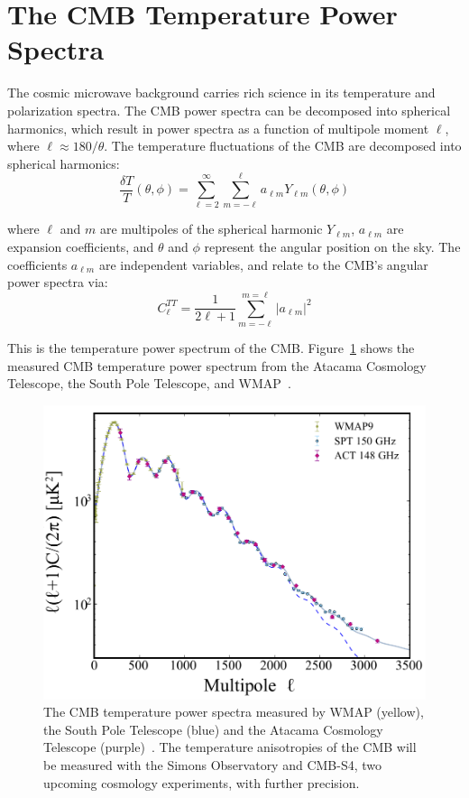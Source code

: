 \section{The CMB Temperature Power Spectra}
The cosmic microwave background carries rich science in its temperature and polarization spectra.  The CMB power spectra can be decomposed into spherical harmonics, which result in power spectra as a function of multipole moment $\ell$, where $\ell\approx180/\theta$.  The temperature fluctuations of the CMB are decomposed into spherical harmonics:
\begin{equation}
\frac{\delta T}{T}(\theta,\phi) = \sum_{\ell=2}^{\infty} \sum_{m=-\ell}^{\ell} a_{\ell m} Y_{\ell m}(\theta,\phi)
    \label{eq:cmb_temp}
\end{equation}

where $\ell$ and $m$ are multipoles of the spherical harmonic $Y_{\ell m}$, $a_{\ell m}$ are expansion coefficients, and $\theta$ and $\phi$ represent the angular position on the sky.  The coefficients $a_{\ell m}$ are independent variables, and relate to the CMB's angular power spectra via:
\begin{equation}
    C_\ell^{TT} = \frac{1}{2\ell +1} \sum_{m=-\ell}^{m=\ell} |a_{\ell m}|^2
\end{equation}

This is the temperature power spectrum of the CMB.  Figure~\ref{fig:measured_cmb_spec} shows the measured CMB temperature power spectrum from the Atacama Cosmology Telescope, the South Pole Telescope, and WMAP~\cite{Das_2014}.
\begin{figure}[t]
    \centering
    \includegraphics[width = .8\textwidth]{Figures/temp_power_spectrum.pdf}
    \caption{The CMB temperature power spectra measured by WMAP (yellow), the South Pole Telescope (blue) and the Atacama Cosmology Telescope (purple)~\cite{Das_2014}.  The temperature anisotropies of the CMB will be measured with the Simons Observatory and CMB-S4, two upcoming cosmology experiments, with further precision.}
    \label{fig:measured_cmb_spec}
\end{figure}

